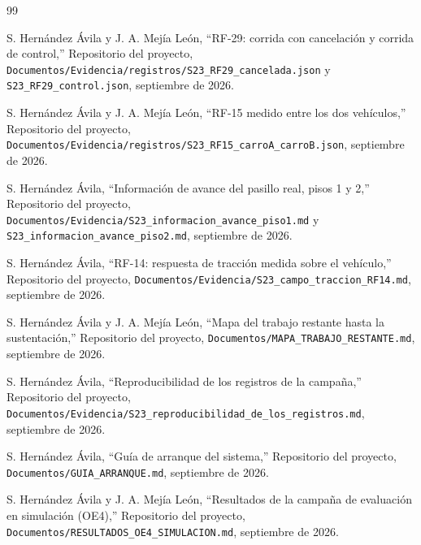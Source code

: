\documentclass[12pt,letterpaper]{article}
\begin{document}
\begin{thebibliography}{99}

S. Hernández Ávila y J. A. Mejía León,
``RF-29: corrida con cancelación y corrida de control,''
Repositorio del proyecto, \texttt{Documentos/Evidencia/registros/S23\_RF29\_cancelada.json} y \texttt{S23\_RF29\_control.json}, septiembre de 2026.

S. Hernández Ávila y J. A. Mejía León,
``RF-15 medido entre los dos vehículos,''
Repositorio del proyecto, \texttt{Documentos/Evidencia/registros/S23\_RF15\_carroA\_carroB.json}, septiembre de 2026.

S. Hernández Ávila,
``Información de avance del pasillo real, pisos 1 y 2,''
Repositorio del proyecto, \texttt{Documentos/Evidencia/S23\_informacion\_avance\_piso1.md} y \texttt{S23\_informacion\_avance\_piso2.md}, septiembre de 2026.

S. Hernández Ávila,
``RF-14: respuesta de tracción medida sobre el vehículo,''
Repositorio del proyecto, \texttt{Documentos/Evidencia/S23\_campo\_traccion\_RF14.md}, septiembre de 2026.

S. Hernández Ávila y J. A. Mejía León,
``Mapa del trabajo restante hasta la sustentación,''
Repositorio del proyecto, \texttt{Documentos/MAPA\_TRABAJO\_RESTANTE.md}, septiembre de 2026.

S. Hernández Ávila,
``Reproducibilidad de los registros de la campaña,''
Repositorio del proyecto, \texttt{Documentos/Evidencia/S23\_reproducibilidad\_de\_los\_registros.md}, septiembre de 2026.

S. Hernández Ávila,
``Guía de arranque del sistema,''
Repositorio del proyecto, \texttt{Documentos/GUIA\_ARRANQUE.md}, septiembre de 2026.

S. Hernández Ávila y J. A. Mejía León,
``Resultados de la campaña de evaluación en simulación (OE4),''
Repositorio del proyecto, \texttt{Documentos/RESULTADOS\_OE4\_SIMULACION.md}, septiembre de 2026.

\end{thebibliography}
\end{document}
